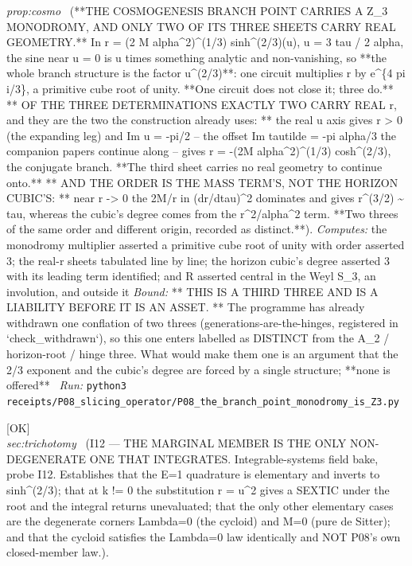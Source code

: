 \begin{description}
\textit{prop:cosmo} \ (**THE COSMOGENESIS BRANCH POINT CARRIES A Z\_3 MONODROMY, AND ONLY TWO OF ITS THREE SHEETS CARRY REAL GEOMETRY.** In r = (2 M alpha\textasciicircum{}2)\textasciicircum{}(1/3) sinh\textasciicircum{}(2/3)(u), u = 3 tau / 2 alpha, the sine near u = 0 is u times something analytic and non-vanishing, so **the whole branch structure is the factor u\textasciicircum{}(2/3)**: one circuit multiplies r by e\textasciicircum{}\{4 pi i/3\}, a primitive cube root of unity. **One circuit does not close it; three do.** ** OF THE THREE DETERMINATIONS EXACTLY TWO CARRY REAL r, and they are the two the construction already uses: ** the real u axis gives r > 0 (the expanding leg) and Im u = -pi/2 -- the offset Im tautilde = -pi alpha/3 the companion papers continue along -- gives r = -(2M alpha\textasciicircum{}2)\textasciicircum{}(1/3) cosh\textasciicircum{}(2/3), the conjugate branch. **The third sheet carries no real geometry to continue onto.** ** AND THE ORDER IS THE MASS TERM'S, NOT THE HORIZON CUBIC'S: ** near r -> 0 the 2M/r in (dr/dtau)\textasciicircum{}2 dominates and gives r\textasciicircum{}(3/2) \textasciitilde{} tau, whereas the cubic's degree comes from the r\textasciicircum{}2/alpha\textasciicircum{}2 term. **Two threes of the same order and different origin, recorded as distinct.**). 
\emph{Computes:} the monodromy multiplier asserted a primitive cube root of unity with order asserted 3; the real-r sheets tabulated line by line; the horizon cubic's degree asserted 3 with its leading term identified; and R asserted central in the Weyl S\_3, an involution, and outside it
 \emph{Bound:} ** THIS IS A THIRD THREE AND IS A LIABILITY BEFORE IT IS AN ASSET. ** The programme has already withdrawn one conflation of two threes (generations-are-the-hinges, registered in `check\_withdrawn`), so this one enters labelled as DISTINCT from the A\_2 / horizon-root / hinge three. What would make them one is an argument that the 2/3 exponent and the cubic's degree are forced by a single structure; **none is offered**
\ \emph{Run:} \texttt{python3 receipts/P08\_slicing\_operator/P08\_the\_branch\_point\_monodromy\_is\_Z3.py}
\item[\rcptlabel{I12_the_marginal_member_is_the_only_non_degenerate_one_that_integrates}{P8R18}\textbf{P8R18}\quad\texttt{I12\_the\_marginal\_member\_is\_the\_only\_non\_degenerate\_one\_that\_integrates}]\hfill\textsf{[OK]}\\
\textit{sec:trichotomy} \ (I12 --- THE MARGINAL MEMBER IS THE ONLY NON-DEGENERATE ONE THAT INTEGRATES. Integrable-systems field bake, probe I12. Establishes that the E=1 quadrature is elementary and inverts to sinh\textasciicircum{}(2/3); that at k != 0 the substitution r = u\textasciicircum{}2 gives a SEXTIC under the root and the integral returns unevaluated; that the only other elementary cases are the degenerate corners Lambda=0 (the cycloid) and M=0 (pure de Sitter); and that the cycloid satisfies the Lambda=0 law identically and NOT P08's own closed-member law.). 

\end{description}
